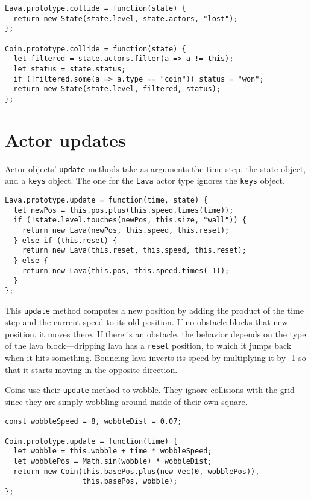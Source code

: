 \begin{lstlisting}
Lava.prototype.collide = function(state) {
  return new State(state.level, state.actors, "lost");
};

Coin.prototype.collide = function(state) {
  let filtered = state.actors.filter(a => a != this);
  let status = state.status;
  if (!filtered.some(a => a.type == "coin")) status = "won";
  return new State(state.level, filtered, status);
};
\end{lstlisting}
\noindent

\label{game.actors}\section{Actor updates}

Actor objects' \lstinline`update` methods take as arguments the time step, the state object, and a \lstinline`keys` object. The one for the \lstinline`Lava` actor type ignores the \lstinline`keys` object.

\begin{lstlisting}
Lava.prototype.update = function(time, state) {
  let newPos = this.pos.plus(this.speed.times(time));
  if (!state.level.touches(newPos, this.size, "wall")) {
    return new Lava(newPos, this.speed, this.reset);
  } else if (this.reset) {
    return new Lava(this.reset, this.speed, this.reset);
  } else {
    return new Lava(this.pos, this.speed.times(-1));
  }
};
\end{lstlisting}
\noindent{}

This \lstinline`update` method computes a new position by adding the product of the time step and the current speed to its old position. If no obstacle blocks that new position, it moves there. If there is an obstacle, the behavior depends on the type of the lava block—dripping lava has a \lstinline`reset` position, to which it jumps back when it hits something. Bouncing lava inverts its speed by multiplying it by -1 so that it starts moving in the opposite direction.

Coins use their \lstinline`update` method to wobble. They ignore collisions with the grid since they are simply wobbling around inside of their own square.

\begin{lstlisting}
const wobbleSpeed = 8, wobbleDist = 0.07;

Coin.prototype.update = function(time) {
  let wobble = this.wobble + time * wobbleSpeed;
  let wobblePos = Math.sin(wobble) * wobbleDist;
  return new Coin(this.basePos.plus(new Vec(0, wobblePos)),
                  this.basePos, wobble);
};
\end{lstlisting}
\noindent{}

